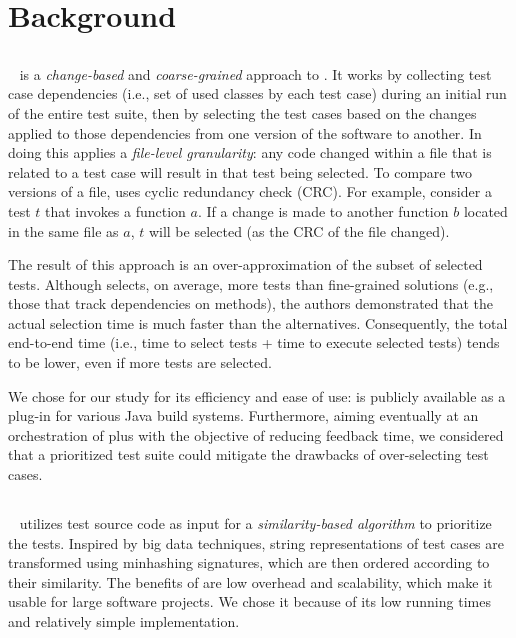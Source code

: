 \section{Background}\label{sec:orch_background}

\subsection{\ek}\label{sec:orch_ekstazi}
\ek~\cite{gligoricEk} is a \textit{change-based} and \textit{coarse-grained} approach to \tcs.
It works by collecting test case dependencies (i.e., set of used classes by each test case) during an initial run of the entire test suite, then by selecting the test cases based on the changes applied to those dependencies from one version of the software to another.
In doing this \ek applies a \textit{file-level granularity}: any code changed within a file that is related to a test case will result in that test being selected.  To compare two versions of a file, \ek uses cyclic redundancy check (CRC).
For example, consider a test $t$ that invokes a function $a$.
If a change is made to another function $b$ located in the same file as $a$,
$t$ will be selected (as the CRC of the file changed).

The result of this approach is an over-approximation of the subset of selected tests.
Although \ek selects, on average, more tests than fine-grained \tcs solutions (e.g., those that track dependencies on methods), the authors demonstrated that the actual selection time is much faster than the alternatives. 
Consequently, the total end-to-end time (i.e., time to select tests + time to execute selected tests) tends to be lower, even if more tests are selected. 

We chose \ek for our study for its efficiency and ease of use: \ek is publicly available as a plug-in for various Java build systems.
Furthermore, aiming eventually at an orchestration of \tcs plus \tcp with the objective of reducing feedback time, we considered that 
a prioritized test suite could mitigate the drawbacks of over-selecting test cases.

\subsection{\fs}\label{sec:orch_fast}

\fs~\cite{miranda_fast} utilizes test source code as input for a \emph{similarity-based algorithm} to prioritize the tests.
Inspired by big data techniques, string representations of test cases are transformed using minhashing signatures, which are then ordered according to their similarity.
The benefits of \fs are low overhead and scalability, which make it usable for large software projects.
We chose it because of its low running times and relatively simple implementation.

